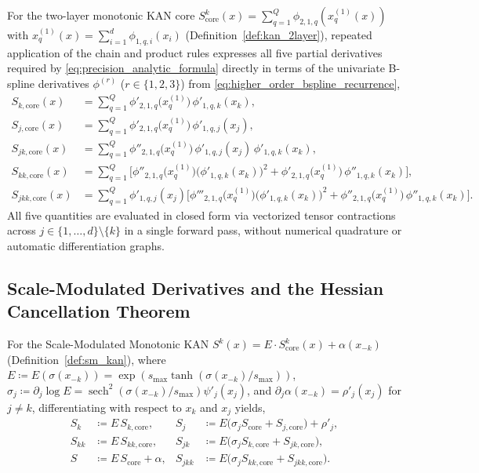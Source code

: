 \documentclass[11pt,a4paper]{article}
\theoremstyle{plain}
\theoremstyle{definition}
\theoremstyle{remark}
\begin{document}
For the two-layer monotonic KAN core $S^k_{\text{core}}(x) = \sum_{q=1}^Q \phi_{2, 1, q}(x^{(1)}_q(x))$ with $x^{(1)}_q(x) = \sum_{i=1}^d \phi_{1, q, i}(x_i)$ (Definition~\ref{def:kan_2layer}), repeated application of the chain and product rules expresses all five partial derivatives required by \eqref{eq:precision_analytic_formula} directly in terms of the univariate B-spline derivatives $\phi^{(r)}$ ($r \in \{1, 2, 3\}$) from \eqref{eq:higher_order_bspline_recurrence},
\begin{align}
    S_{k, \text{core}}(x) &= \sum_{q=1}^Q \phi'_{2, 1, q}\big(x^{(1)}_q\big) \, \phi'_{1, q, k}(x_k), \label{eq:core_deriv_sk} \\
    S_{j, \text{core}}(x) &= \sum_{q=1}^Q \phi'_{2, 1, q}\big(x^{(1)}_q\big) \, \phi'_{1, q, j}(x_j), \label{eq:core_deriv_sj} \\
    S_{jk, \text{core}}(x) &= \sum_{q=1}^Q \phi''_{2, 1, q}\big(x^{(1)}_q\big) \, \phi'_{1, q, j}(x_j) \, \phi'_{1, q, k}(x_k), \label{eq:core_deriv_sjk} \\
    S_{kk, \text{core}}(x) &= \sum_{q=1}^Q \Big[ \phi''_{2, 1, q}\big(x^{(1)}_q\big) \big(\phi'_{1, q, k}(x_k)\big)^2 + \phi'_{2, 1, q}\big(x^{(1)}_q\big) \, \phi''_{1, q, k}(x_k) \Big], \label{eq:core_deriv_skk} \\
    S_{jkk, \text{core}}(x) &= \sum_{q=1}^Q \phi'_{1, q, j}(x_j) \Big[ \phi'''_{2, 1, q}\big(x^{(1)}_q\big) \big(\phi'_{1, q, k}(x_k)\big)^2 + \phi''_{2, 1, q}\big(x^{(1)}_q\big) \, \phi''_{1, q, k}(x_k) \Big]. \label{eq:core_deriv_sjkk}
\end{align}
All five quantities are evaluated in closed form via vectorized tensor contractions across $j \in \{1, \dots, d\} \setminus \{k\}$ in a single forward pass, without numerical quadrature or automatic differentiation graphs.

\subsection{Scale-Modulated Derivatives and the Hessian Cancellation Theorem}
\label{subsec:hessian_cancellation}

For the Scale-Modulated Monotonic KAN $S^k(x) = E \cdot S^k_{\text{core}}(x) + \alpha(x_{-k})$ (Definition~\ref{def:sm_kan}), where $E \coloneqq E(\sigma(x_{-k})) = \exp(s_{\max}\tanh(\sigma(x_{-k})/s_{\max}))$, $\sigma_j \coloneqq \partial_j \log E = \operatorname{sech}^2(\sigma(x_{-k})/s_{\max})\psi'_j(x_j)$, and $\partial_j \alpha(x_{-k}) = \rho'_j(x_j)$ for $j \neq k$, differentiating with respect to $x_k$ and $x_j$ yields,
\begin{align}
    S_k &\coloneqq E \, S_{k, \text{core}}, & S_j &\coloneqq E \big( \sigma_j S_{\text{core}} + S_{j, \text{core}} \big) + \rho'_j, \label{eq:sm_partials_1} \\
    S_{kk} &\coloneqq E \, S_{kk, \text{core}}, & S_{jk} &\coloneqq E \big( \sigma_j S_{k, \text{core}} + S_{jk, \text{core}} \big), \label{eq:sm_partials_2} \\
    S &\coloneqq E \, S_{\text{core}} + \alpha, & S_{jkk} &\coloneqq E \big( \sigma_j S_{kk, \text{core}} + S_{jkk, \text{core}} \big). \label{eq:sm_partials_3}
\end{align}
\end{document}
